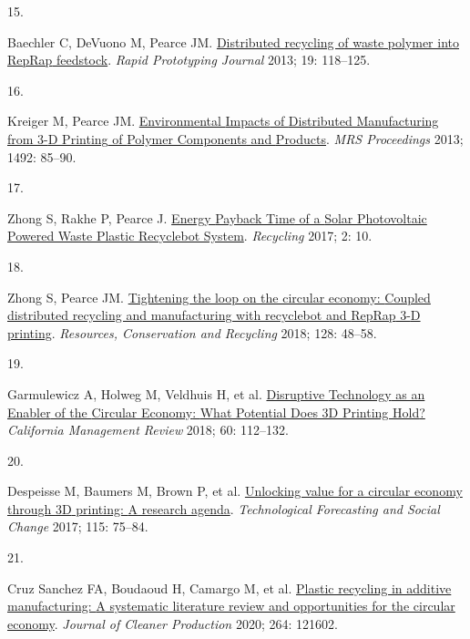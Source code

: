 \documentclass[
  11pt,
  a4paperpaper,
  onecolumn]{article}
\newlength{\cslhangindent}
\newlength{\csllabelwidth}
\newlength{\cslentryspacingunit} %
\newenvironment{CSLReferences}[2] %
 {%
  \setlength{\parindent}{0pt}
  \ifodd #1
  \let\oldpar\par
  \def\par{\hangindent=\cslhangindent\oldpar}
  \fi
  \setlength{\parskip}{#2\cslentryspacingunit}
 }%
 {}
\newcommand{\CSLLeftMargin}[1]{\parbox[t]{\csllabelwidth}{#1}}
\newcommand{\CSLRightInline}[1]{\parbox[t]{\linewidth - \csllabelwidth}{#1}\break}
\begin{document}
\begin{CSLReferences}{0}{0}
\leavevmode{}%
\CSLLeftMargin{15. }%
\CSLRightInline{Baechler C, DeVuono M, Pearce JM.
\href{https://doi.org/10.1108/13552541311302978}{Distributed recycling
of waste polymer into {RepRap} feedstock}. \emph{Rapid Prototyping
Journal} 2013; 19: 118--125.}

\leavevmode{}%
\CSLLeftMargin{16. }%
\CSLRightInline{Kreiger M, Pearce JM.
\href{https://doi.org/10.1557/opl.2013.319}{Environmental {Impacts} of
{Distributed Manufacturing} from 3-{D Printing} of {Polymer Components}
and {Products}}. \emph{MRS Proceedings} 2013; 1492: 85--90.}

\leavevmode{}%
\CSLLeftMargin{17. }%
\CSLRightInline{Zhong S, Rakhe P, Pearce J.
\href{https://doi.org/10.3390/recycling2020010}{Energy {Payback Time} of
a {Solar Photovoltaic Powered Waste Plastic Recyclebot System}}.
\emph{Recycling} 2017; 2: 10.}

\leavevmode{}%
\CSLLeftMargin{18. }%
\CSLRightInline{Zhong S, Pearce JM.
\href{https://doi.org/10.1016/j.resconrec.2017.09.023}{Tightening the
loop on the circular economy: {Coupled} distributed recycling and
manufacturing with recyclebot and {RepRap} 3-{D} printing}.
\emph{Resources, Conservation and Recycling} 2018; 128: 48--58.}

\leavevmode{}%
\CSLLeftMargin{19. }%
\CSLRightInline{Garmulewicz A, Holweg M, Veldhuis H, et al.
\href{https://doi.org/10.1177/0008125617752695}{Disruptive {Technology}
as an {Enabler} of the {Circular Economy}: {What Potential Does 3D
Printing Hold}?} \emph{California Management Review} 2018; 60:
112--132.}

\leavevmode{}%
\CSLLeftMargin{20. }%
\CSLRightInline{Despeisse M, Baumers M, Brown P, et al.
\href{https://doi.org/10.1016/j.techfore.2016.09.021}{Unlocking value
for a circular economy through {3D} printing: {A} research agenda}.
\emph{Technological Forecasting and Social Change} 2017; 115: 75--84.}

\leavevmode{}%
\CSLLeftMargin{21. }%
\CSLRightInline{Cruz Sanchez FA, Boudaoud H, Camargo M, et al.
\href{https://doi.org/10.1016/j.jclepro.2020.121602}{Plastic recycling
in additive manufacturing: {A} systematic literature review and
opportunities for the circular economy}. \emph{Journal of Cleaner
Production} 2020; 264: 121602.}


\end{CSLReferences}
\end{document}
